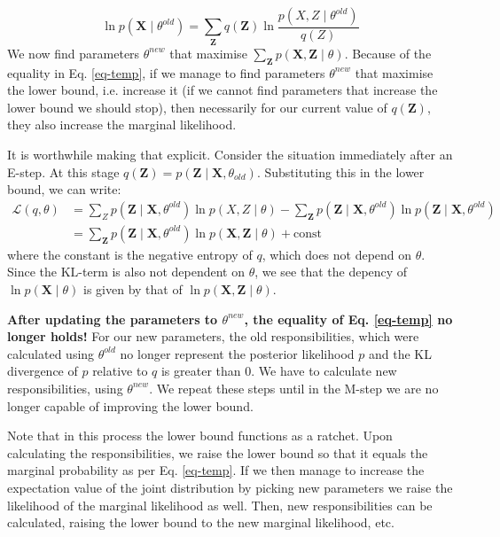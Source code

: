 \begin{equation}
\ln p(\boldsymbol{X} \mid \theta^{old}) = \sum_{\boldsymbol{Z}} q(\boldsymbol{Z})  \ln \frac{p(X,Z \mid \theta^{old})}{q(Z)}
\label{eq-temp}
\end{equation}
We now find parameters $\theta^{new}$ that maximise $\sum_{\boldsymbol{Z}} p( \boldsymbol{X}, \boldsymbol{Z} \mid \theta)$. Because of the equality in Eq. \ref{eq-temp},
if we manage to find parameters $\theta^{new}$ that maximise the lower bound, i.e. increase it (if we cannot find parameters that increase the lower bound we should stop),
then necessarily for our current value of $q(\boldsymbol{Z})$, they also increase the marginal likelihood.

It is worthwhile making that explicit. Consider the situation immediately after an E-step.
At this stage $q(\boldsymbol{Z}) = p(\boldsymbol{Z} \mid \boldsymbol{X}, \theta_{old})$.
Substituting this in the lower bound, we can write:
\begin{align}
  \mathcal{L}(q, \theta) &  = \sum_{Z}p(\boldsymbol{Z} \mid \boldsymbol{X}, \theta^{old}) \ln p (X, Z \mid \theta) - \sum_{\boldsymbol{Z}} p (\boldsymbol{Z} \mid \boldsymbol{X}, \theta^{old})  \ln p( \boldsymbol{Z} \mid \boldsymbol{X}, \theta^{old}) \nonumber \\
  & = \sum_{\boldsymbol{Z}} p( \boldsymbol{Z} \mid \boldsymbol{X}, \theta^{old}) \ln p(\boldsymbol{X}, \boldsymbol{Z} \mid \theta) + \mbox{const}
  \label{eq-dependency}
\end{align}
where the constant is the negative entropy of $q$, which does not depend on $\theta$. Since the $\mbox{KL}$-term is also not dependent on $\theta$, we see that
the depency of $\ln p(\boldsymbol{X} \mid \theta)$ is given by that of $\ln p(\boldsymbol{X}, \boldsymbol{Z} \mid \theta)$.



{\bf After updating the parameters to $\theta^{new}$, the equality
  of Eq. \ref{eq-temp} no longer holds!} For our new parameters, the old responsibilities, which were calculated using $\theta^{old}$ no longer represent the posterior likelihood
$p$ and the KL divergence of $p$ relative to $q$ is greater than 0. We have to calculate new responsibilities, using $\theta^{new}$. We repeat these steps
until in the M-step we are no longer capable of improving the lower bound.

Note that in this process the lower bound functions as a ratchet. Upon calculating the responsibilities, we raise the lower bound so that it equals the marginal probability
as per Eq. \ref{eq-temp}. If we then manage to increase the expectation value of the joint distribution by picking new parameters we raise the likelihood
of the marginal likelihood as well. Then, new responsibilities can be calculated, raising the lower bound to the new marginal likelihood, etc.

